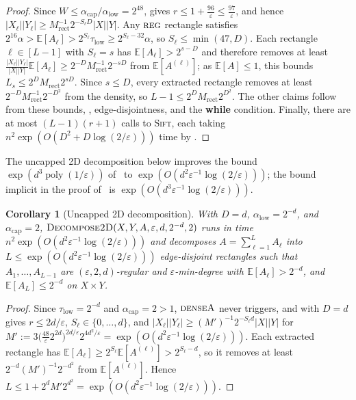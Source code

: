 \documentclass[11pt]{article}
\newtheorem{corollary}[theorem]{Corollary}
\theoremstyle{definition}
\renewcommand{\label}[1]{}%
\newcommand{\E}{\mathbb{E}}
\newcommand{\poly}{\operatorname{poly}}
\newcommand{\abs}[1]{\left\lvert #1 \right\rvert}
\newcommand{\dens}[1]{\E[#1]}
\newcommand{\Sift}{\textnormal{\textsc{Sift}}}
\newcommand{\DecomposeTwoD}{\textnormal{\textsc{Decompose2D}}}
\newcommand{\tagreg}{\textnormal{\textsc{reg}}}
\newcommand{\tagdenseA}{\textnormal{\textsc{denseA}}}
\begin{document}
\begin{proof}
Since $W \le \alpha_{\text{cap}}/\alpha_{\text{low}} = 2^{48}$,  gives $r \le 1 + \frac{96}{\varepsilon} \le \frac{97}{\varepsilon}$, and hence $\abs{X_\ell}\abs{Y_\ell} \ge M_{\text{rect}}^{-1} 2^{-S_\ell D}\abs{X}\abs{Y}$. Any $\tagreg$ rectangle satisfies $2^{16}\alpha > \dens{A_\ell} > 2^{S_\ell}\tau_{\text{low}} \ge 2^{S_\ell - 32}\alpha$, so $S_\ell \le \min(47, D)$. Each rectangle $\ell \in [L-1]$ with $S_\ell = s$ has $\dens{A_\ell} > 2^{s-D}$ and therefore removes at least $\frac{\abs{X_\ell}\abs{Y_\ell}}{\abs{X}\abs{Y}}\dens{A_\ell} \ge 2^{-D} M_{\text{rect}}^{-1} 2^{-s D}$ from $\dens{A^{(\ell)}}$; as $\dens{A} \le 1$, this bounds $L_s \le 2^D M_{\text{rect}} 2^{s D}$. Since $s \le D$, every extracted rectangle removes at least $2^{-D} M_{\text{rect}}^{-1} 2^{-D^2}$ from the density, so $L - 1 \le 2^D M_{\text{rect}} 2^{D^2}$. The other claims follow from these bounds, , edge-disjointness, and the \textbf{while} condition. Finally, there are at most $(L-1)(r+1)$ calls to \Sift{}, each taking $n^2 \exp(O(D^2 + D\log(2/\varepsilon)))$ time by .
\end{proof}

The uncapped 2D decomposition below improves the bound $\exp(d^3\poly(1/\varepsilon))$ of~\cite[Theorem~3.3]{AFKLM24} to $\exp(O(d^2 \varepsilon^{-1}\log(2/\varepsilon)))$; the bound implicit in the proof of~\cite[Theorem~3.3]{AFKLM24} is $\exp(O(d^3 \varepsilon^{-1}\log(2/\varepsilon)))$.

\begin{corollary}[Uncapped 2D decomposition]
\label{cor:uncapped-2d}
With $D = d$, $\alpha_{\text{low}} = 2^{-d}$, and $\alpha_{\text{cap}} = 2$, $\DecomposeTwoD(X, Y, A, \varepsilon, d, 2^{-d}, 2)$ runs in time $n^2 \exp(O(d^2 \varepsilon^{-1}\log(2/\varepsilon)))$ and decomposes $A = \sum_{\ell=1}^L A_\ell$ into $L \le \exp(O(d^2 \varepsilon^{-1}\log(2/\varepsilon)))$ edge-disjoint rectangles such that $A_1, \dots, A_{L-1}$ are $(\varepsilon, 2, d)$-regular and $\varepsilon$-min-degree with $\dens{A_\ell} > 2^{-d}$, and $\dens{A_L} \le 2^{-d}$ on $X \times Y$.
\end{corollary}

\begin{proof}
Since $\tau_{\text{low}} = 2^{-d}$ and $\alpha_{\text{cap}} = 2 > 1$, $\tagdenseA$ never triggers, and  with $D = d$ gives $r \le 2d/\varepsilon$, $S_\ell \in \{0, \dots, d\}$, and $\abs{X_\ell}\abs{Y_\ell} \ge (M')^{-1} 2^{-S_\ell d}\abs{X}\abs{Y}$ for $M' := 3\big(\frac{48}{\varepsilon} 2^{2d}\big)^{2d/\varepsilon} 2^{4d^2/\varepsilon} = \exp(O(d^2 \varepsilon^{-1}\log(2/\varepsilon)))$. Each extracted rectangle has $\dens{A_\ell} \ge 2^{S_\ell}\dens{A^{(\ell)}} > 2^{S_\ell - d}$, so it removes at least $2^{-d} (M')^{-1} 2^{-d^2}$ from $\dens{A^{(\ell)}}$. Hence $L \le 1 + 2^d M' 2^{d^2} = \exp(O(d^2 \varepsilon^{-1}\log(2/\varepsilon)))$.
\end{proof}
\end{document}
